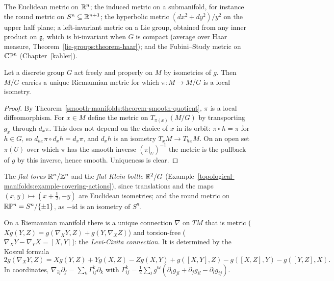 \begin{example}\label{riemannian-geometry:example-metrics}
The Euclidean metric on $\mathbb{R}^n$; the induced metric on a submanifold, for instance the round metric on $S^n \subseteq \mathbb{R}^{n+1}$; the hyperbolic metric $(dx^2 + dy^2)/y^2$ on the upper half plane; a
left-invariant metric on a Lie group, obtained from any inner product on $\mathfrak{g}$, which is bi-invariant when $G$ is compact (average over Haar measure,
Theorem~\ref{lie-groups:theorem-haar}); and the Fubini--Study metric on $\mathbb{C}\mathbb{P}^n$ (Chapter~\ref{kahler}).
\end{example}

\begin{proposition}\label{riemannian-geometry:proposition-quotient-metric}
Let a discrete group $G$ act freely and properly on $M$ by isometries of $g$. Then $M/G$ carries a unique Riemannian metric for which $\pi \colon M \to M/G$ is a local isometry.
\end{proposition}

\begin{proof}
By Theorem~\ref{smooth-manifolds:theorem-smooth-quotient}, $\pi$ is a local diffeomorphism. For $x \in M$ define the metric on $T_{\pi(x)}(M/G)$ by transporting $g_x$ through $d_x\pi$. This does not depend on the choice of $x$
in its orbit: $\pi \circ h = \pi$ for $h \in G$, so $d_{hx}\pi \circ d_xh = d_x\pi$, and $d_xh$ is an isometry $T_xM \to T_{hx}M$. On an open set $\pi(U)$ over which $\pi$ has the smooth inverse $(\pi|_U)^{-1}$ the metric is the pullback
of $g$ by this inverse, hence smooth. Uniqueness is clear.
\end{proof}

\begin{example}\label{riemannian-geometry:example-quotient-metrics}
The \emph{flat torus} $\mathbb{R}^n/\mathbb{Z}^n$ and the \emph{flat Klein bottle} $\mathbb{R}^2/G$ (Example~\ref{topological-manifolds:example-covering-actions}), since translations and the maps $(x, y) \mapsto (x + \frac12, -y)$ are Euclidean isometries; and
the round metric on $\mathbb{R}\mathbb{P}^n = S^n/\{\pm1\}$, as $-\mathrm{id}$ is an isometry of $S^n$.
\end{example}

\begin{theorem}\label{riemannian-geometry:theorem-levi-civita}
On a Riemannian manifold there is a unique connection $\nabla$ on $TM$ that is metric ($Xg(Y, Z) = g(\nabla_XY, Z) + g(Y, \nabla_XZ)$) and torsion-free ($\nabla_XY - \nabla_YX = [X, Y]$): the
\emph{Levi-Civita connection}. It is determined by the Koszul formula
\[
2g(\nabla_XY, Z) = Xg(Y, Z) + Yg(X, Z) - Zg(X, Y) + g([X, Y], Z) - g([X, Z], Y) - g([Y, Z], X).
\]
In coordinates, $\nabla_{\partial_i}\partial_j = \sum_k\Gamma^k_{ij}\partial_k$ with $\Gamma^k_{ij} = \frac12\sum_lg^{kl}(\partial_ig_{jl} + \partial_jg_{il} - \partial_lg_{ij})$.
\end{theorem}

